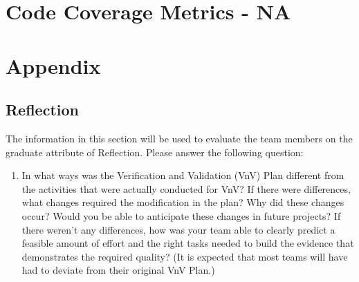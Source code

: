 \documentclass[12pt, titlepage]{article}
\begin{document}
\section{Code Coverage Metrics - NA}




\newpage{}
\section{Appendix}
\subsection{Reflection}

The information in this section will be used to evaluate the team members on the
graduate attribute of Reflection.  Please answer the following question:

\begin{enumerate}
  \item In what ways was the Verification and Validation (VnV) Plan different
  from the activities that were actually conducted for VnV?  If there were
  differences, what changes required the modification in the plan?  Why did
  these changes occur?  Would you be able to anticipate these changes in future
  projects?  If there weren't any differences, how was your team able to clearly
  predict a feasible amount of effort and the right tasks needed to build the
  evidence that demonstrates the required quality?  (It is expected that most
  teams will have had to deviate from their original VnV Plan.)
\end{enumerate}
\end{document}
